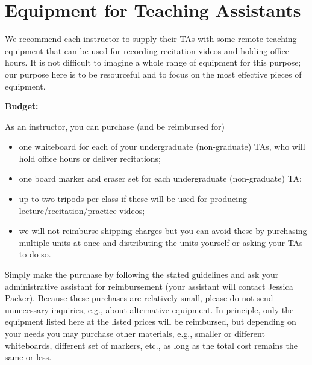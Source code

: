 \chapter{ Equipment for Teaching Assistants}


\begin{gram}
We recommend each instructor to supply their TAs with some
remote-teaching equipment that can be used for recording recitation
videos and holding office hours.
%
It is not difficult to imagine a whole range of equipment for this
purpose; our purpose here is to be resourceful and to focus on the most
effective pieces of equipment.
%

\textbf{Budget:}

As an instructor, you can purchase (and be reimbursed for)
\begin{itemize}
\item one whiteboard for each of your undergraduate (non-graduate) TAs, who will hold office hours or deliver recitations;


\item one board marker and eraser set for each undergraduate
  (non-graduate) TA;

\item
up to two tripods per class if these will be used for producing lecture/recitation/practice videos;

\item we will not reimburse shipping charges but you can avoid these by  purchasing multiple units at once and distributing the units yourself or asking your TAs to do so.

\end{itemize}

\end{gram}

\begin{important}[Reimbursement]
Simply make the purchase by following the stated guidelines and ask
your administrative assistant for reimbursement (your assistant will
contact Jessica Packer).
%
Because these purchases are relatively small, please do not send unnecessary inquiries, e.g., about alternative equipment.
%
In principle, only the equipment listed here at the listed prices will
be reimbursed, but depending on your needs you may purchase other
materials, e.g., smaller or different whiteboards, different set of
markers, etc., as long as the total cost remains the same or less.
\end{important}


